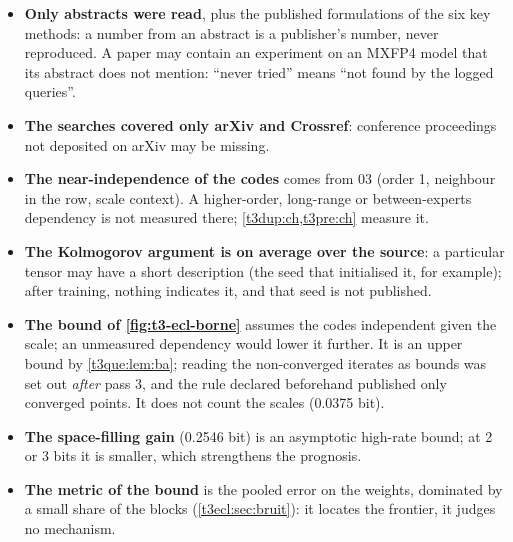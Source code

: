 \begin{faux}
\begin{itemize}
\item \textbf{Only abstracts were read}, plus the published formulations of the six key methods: a number from an abstract is a publisher's number, never reproduced. A paper may contain an experiment on an MXFP4 model that its abstract does not mention: ``never tried'' means ``not found by the logged queries''.
\item \textbf{The searches covered only arXiv and Crossref}: conference proceedings not deposited on arXiv may be missing.
\item \textbf{The near-independence of the codes} comes from 03 (order 1, neighbour in the row, scale context). A higher-order, long-range or between-experts dependency is not measured there; \cref{t3dup:ch,t3pre:ch} measure it.
\item \textbf{The Kolmogorov argument is on average over the source}: a particular tensor may have a short description (the seed that initialised it, for example); after training, nothing indicates it, and that seed is not published.
\item \textbf{The bound of \cref{fig:t3-ecl-borne}} assumes the codes independent given the scale; an unmeasured dependency would lower it further. It is an upper bound by \cref{t3que:lem:ba}; reading the non-converged iterates as bounds was set out \emph{after} pass 3, and the rule declared beforehand published only converged points. It does not count the scales (0.0375 bit).
\item \textbf{The space-filling gain} (0.2546 bit) is an asymptotic high-rate bound; at 2 or 3 bits it is smaller, which strengthens the prognosis.
\item \textbf{The metric of the bound} is the pooled error on the weights, dominated by a small share of the blocks (\cref{t3ecl:sec:bruit}): it locates the frontier, it judges no mechanism.
\end{itemize}
\end{faux}
